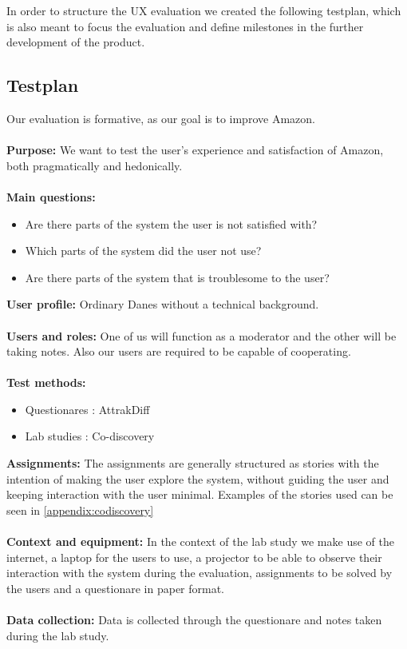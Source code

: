 In order to structure the UX evaluation we created the following testplan, which is also meant to focus the evaluation and define milestones in the further development of the product.

\subsection{Testplan}
Our evaluation is formative, as our goal is to improve Amazon. \\ \\
\textbf{Purpose:} We want to test the user's experience and satisfaction of Amazon, both pragmatically and hedonically. \\ \\
\textbf{Main questions:}
\begin{itemize}
\item Are there parts of the system the user is not satisfied with?
\item Which parts of the system did the user not use?
\item Are there parts of the system that is troublesome to the user?
\end{itemize}
\textbf{User profile:}
Ordinary Danes without a technical background. \\ \\
\textbf{Users and roles:}
One of us will function as a moderator and the other will be taking notes. Also our users are required to be capable of cooperating. \\ \\
\textbf{Test methods:}
\begin{itemize}
\item Questionares : AttrakDiff
\item Lab studies : Co-discovery
\end{itemize}
\textbf{Assignments:} The assignments are generally structured as stories with the intention of making the user explore the system, without guiding the user and keeping interaction with the user minimal. Examples of the stories used can be seen in \autoref{appendix:codiscovery} \\ \\
\textbf{Context and equipment:} In the context of the lab study we make use of the internet, a laptop for the users to use, a projector to be able to observe their interaction with the system during the evaluation, assignments to be solved by the users and a questionare in paper format. \\ \\
\textbf{Data collection:} Data is collected through the questionare and notes taken during the lab study. \\ \\

